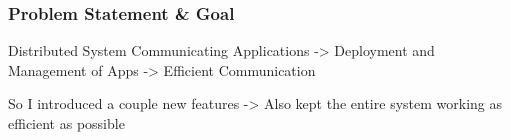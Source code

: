 \begin{frame}
\frametitle{Problem Statement \& Goal}
	Distributed System
	Communicating Applications
	-> Deployment and Management of Apps
	-> Efficient Communication

	So I introduced a couple new features
	-> Also kept the entire system working as efficient as possible
\end{frame}


























